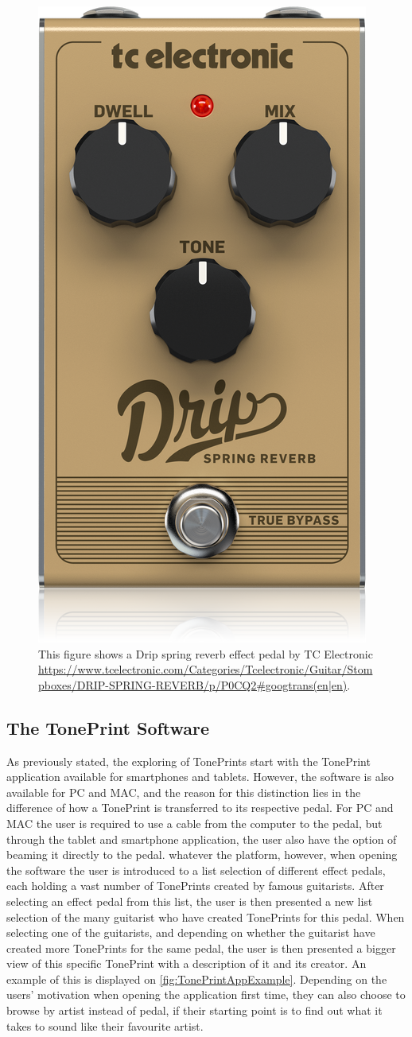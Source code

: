 %
\begin{figure}[H]
	\centering
	\includegraphics[width=.20\textwidth]{Graphics/EffectPedalExample}
	 \caption{This figure shows a Drip spring reverb effect pedal by TC Electronic \url{https://www.tcelectronic.com/Categories/Tcelectronic/Guitar/Stompboxes/DRIP-SPRING-REVERB/p/P0CQ2\#googtrans(en|en)}.}
    \label{fig:EffectPedalExample}
\end{figure}
%
\subsection{The TonePrint Software}
\label{TonePrintSoftware}
As previously stated, the exploring of TonePrints start with the TonePrint application available for smartphones and tablets. However, the software is also available for PC and MAC, and the reason for this distinction lies in the difference of how a TonePrint is transferred to its respective pedal. For PC and MAC the user is required to use a cable from the computer to the pedal, but through the tablet and smartphone application, the user also have the option of beaming it directly to the pedal. whatever the platform, however, when opening the software the user is introduced to a list selection of different effect pedals, each holding a vast number of TonePrints created by famous guitarists. After selecting an effect pedal from this list, the user is then presented a new list selection of the many guitarist who have created TonePrints for this pedal. When selecting one of the guitarists, and depending on whether the guitarist have created more TonePrints for the same pedal, the user is then presented a bigger view of this specific TonePrint with a description of it and its creator. An example of this is displayed on \autoref{fig:TonePrintAppExample}. Depending on the users' motivation when opening the application first time, they can also choose to browse by artist instead of pedal, if their starting point is to find out what it takes to sound like their favourite artist.

